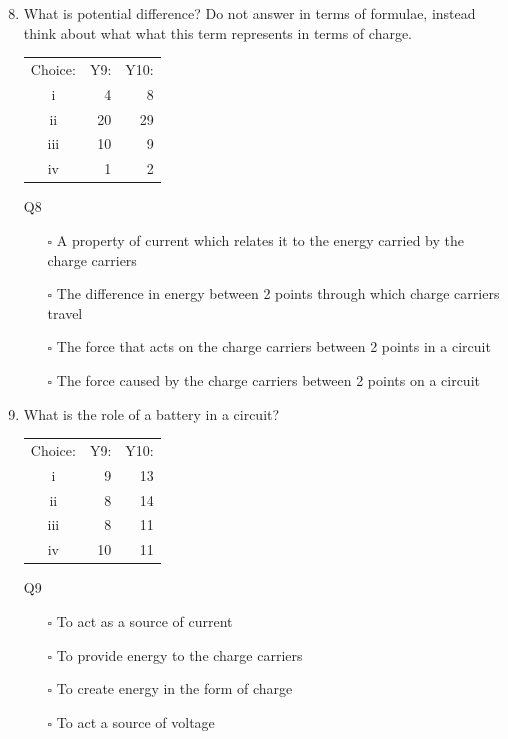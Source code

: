 \documentclass[a4paper,openany,nobib]{tufte-book}
\begin{document}
\newpage
{}
\begin{enumerate}
	\setcounter{enumi}{7}
		\item What is potential difference? Do not answer in terms of formulae, instead think about what what this term represents in terms of charge.
			\begin{margintable}
			\begin{center}
			\begin{tabular}{crr}
			\toprule
			 Choice: & Y9: & Y10:\\
			 i & 4 & 8\\
			 ii & 20 & 29\\
			 iii & 10 & 9\\
			 iv & 1 & 2\\
			 \bottomrule
			\end{tabular}
			\caption{\centering Q8}
			\end{center}
			\end{margintable}
			\begin{itemize}
				\item[$\square$]A property of current which relates it to the energy carried by the charge carriers
				\item[$\square$]The difference in energy between 2 points through which charge carriers travel
				\item[$\square$]The force that acts on the charge carriers between 2 points in a circuit
				\item[$\square$]The force caused by the charge carriers between 2 points on a circuit
			\end{itemize}
		\item What is the role of a battery in a circuit?
			\begin{margintable}[2cm]
			\begin{center}
			\begin{tabular}{crr}
			\toprule
			 Choice: & Y9: & Y10:\\
			 i & 9 & 13\\
			 ii & 8 & 14\\
			 iii & 8 & 11\\
			 iv & 10 & 11\\
			 \bottomrule
			\end{tabular}
			\caption{\centering Q9}
			\end{center}
			\end{margintable}
		\begin{itemize}
			\item[$\square$]To act as a source of current
			\item[$\square$]To provide energy to the charge carriers
			\item[$\square$]To create energy in the form of charge
			\item[$\square$]To act a source of voltage
		\end{itemize}
\end{enumerate}
\end{document}
